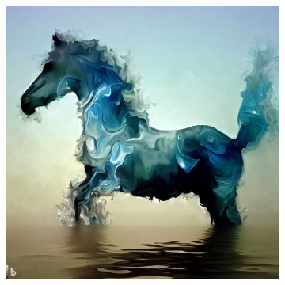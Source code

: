 \documentclass[11pt, twoside]{article}
\begin{document}
\begin{figure}[H]
\begin{subfigure}{0.3\textwidth}
  \end{subfigure}%
  \begin{subfigure}{0.3\textwidth}
    \centering
    \includegraphics[width=0.99\linewidth]{wasserpferd3.jpeg}
  \end{subfigure}
\end{figure}
\end{document}
